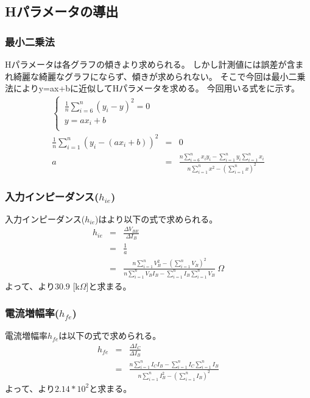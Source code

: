 \documentclass[11pt,dvipdfmx]{jarticle}
\begin{document}
	\subsection{Hパラメータの導出}
	\label{sec:Hパラメータの導出}
		\subsubsection{最小二乗法}
		Hパラメータは各グラフの傾きより求められる。
		しかし計測値には誤差が含まれ綺麗な綺麗なグラフにならず、傾きが求められない。
		そこで今回は最小二乗法によりy=ax+bに近似してHパラメータを求める。
		今回用いる式をに示す。
		\begin{eqnarray}
			\left\{ \,
			\begin{aligned}
				\frac{1}{n}\sum_{i = 6}^{n}(y_i-y)^2=0\\
				y=ax_i+b\\
			\end{aligned}
			\right.\nonumber\\
			\frac{1}{n}\sum_{i = 1}^{n}(y_i-(ax_i+b))^2 &=& 0\nonumber\\
			a &=& \frac{n\sum_{i = 6}^{n}x_iy_i-\sum_{i = 1}^{n}y_i\sum_{i = 1}^{n}x_i}{n\sum_{i = 1}^{n}x^2-(\sum_{i = 1}^{n}x)^2}
			\label{eq:最小二乗法}
		\end{eqnarray}
		\subsubsection{入力インピーダンス($h_{ie}$)}
		入力インピーダンス($h_{ie}$)はより以下の式で求められる。
		\begin{eqnarray}
			h_{ie} &=& \frac{\Delta V_{BE}}{\Delta I_B}\nonumber\\
			&=& \frac{1}{a}\nonumber\\
			&=& \frac{n\sum_{i = 1}^{n}V_B^2-(\sum_{i = 1}^{n}V_B)^2}{n\sum_{i = 1}^{n}V_BI_B-\sum_{i = 1}^{n}I_B\sum_{i = 1}^{n}V_B}\ \Omega
			\label{eq:hieの導出}
		\end{eqnarray}
		よって、より$30.9$ [k$\Omega$]と求まる。
		\subsubsection{電流増幅率($h_{fe}$)}
		電流増幅率$h_{fe}$は以下の式で求められる。
		\begin{eqnarray}
			h_{fe} &=& \frac{\Delta I_C}{\Delta I_B} \nonumber\\
			&=& \frac{n\sum_{i = 1}^{n}I_CI_B-\sum_{i = 1}^{n}I_C\sum_{i = 1}^{n}I_B}{n\sum_{i = 1}^{n}I_B^2-(\sum_{i = 1}^{n}I_B)^2}
			\label{eq:hfeの導出}
		\end{eqnarray}
		よって、より$2.14*10^2$と求まる。
\end{document}
